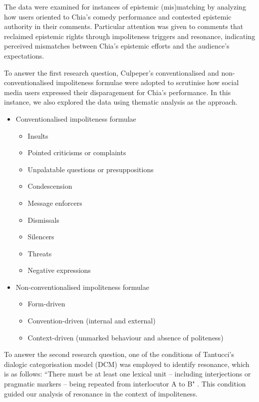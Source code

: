 \documentclass[english]{textolivre}
\begin{document}
The data were examined for instances of epistemic (mis)matching by analyzing how users oriented to Chia’s comedy performance and contested epistemic authority in their comments. Particular attention was given to comments that reclaimed epistemic rights through impoliteness triggers and resonance, indicating perceived mismatches between Chia’s epistemic efforts and the audience's expectations.

To answer the first research question, Culpeper’s \citeyear{culpeper2011} conventionalised and non-conventionalised impoliteness formulae were adopted to scrutinise how social media users expressed their disparagement for Chia’s performance. In this instance, we also explored the data using thematic analysis as the approach.

\begin{itemize}
\item Conventionalised impoliteness formulae
    \begin{itemize}
    \item Insults
    \item Pointed criticisms or complaints
    \item Unpalatable questions or presuppositions
    \item Condescension
    \item Message enforcers
    \item Dismissals
    \item Silencers
    \item Threats
    \item Negative expressions
     \end{itemize}
\item Non-conventionalised impoliteness formulae
    \begin{itemize}
    \item Form-driven
    \item Convention-driven (internal and external)
    \item Context-driven (unmarked behaviour and absence of politeness)
     \end{itemize}
\end{itemize}

To answer the second research question, one of the conditions of Tantucci’s \citeyear{tantucci2023} dialogic categorisation model (DCM) was employed to identify resonance, which is as follows: ``There must be at least one lexical unit -- including interjections or pragmatic markers -- being repeated from interlocutor A to B" \cite[p. 363]{tantucci2023}. This condition guided our analysis of resonance in the context of impoliteness.
\end{document}
